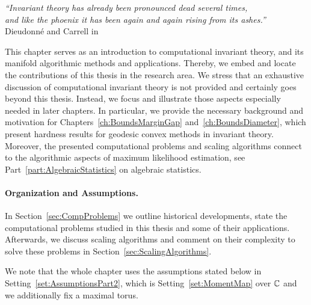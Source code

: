 

\begin{center}
	\emph{``Invariant theory has already been pronounced dead several times,\\and like the phoenix it has been again and again rising from its ashes.''}
	\\ \bigskip
	Dieudonné and Carrell in \cite[page~1]{dieudonneCarrell1970}
\end{center}


\bigskip
\bigskip

This chapter serves as an introduction to computational invariant theory, and its manifold algorithmic methods and applications. 
Thereby, we embed and locate the contributions of this thesis in the research area.
We stress that an exhaustive discussion of computational invariant theory is not provided and certainly goes beyond this thesis. Instead, we focus and illustrate those aspects especially needed in later chapters.
 In particular, we provide the necessary background and motivation for Chapters~\ref{ch:BoundsMarginGap} and~\ref{ch:BoundsDiameter}, which present hardness results for geodesic convex methods in invariant theory. Moreover, the presented computational problems and scaling algorithms connect to the algorithmic aspects of maximum likelihood estimation, see Part~\ref{part:AlgebraicStatistics} on algebraic statistics.

\paragraph{Organization and Assumptions.} In Section~\ref{sec:CompProblems} we outline historical developments, state the computational problems studied in this thesis and some of their applications. Afterwards, we discuss scaling algorithms and comment on their complexity to solve these problems in Section~\ref{sec:ScalingAlgorithms}.

We note that the whole chapter uses the assumptions stated below in Setting~\ref{set:AssumptionsPart2}, which is Setting~\ref{set:MomentMap} over $\mathbb C$ and we additionally fix a maximal torus.

